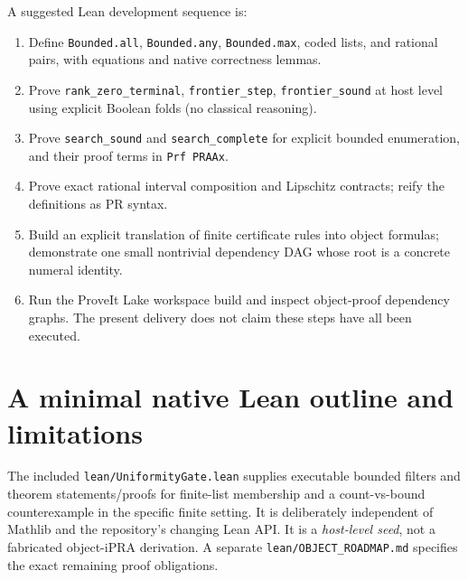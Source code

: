 \documentclass[11pt]{article}
\begin{document}
A suggested Lean development sequence is:
\begin{enumerate}[label=(\arabic*)]
\item Define \texttt{Bounded.all}, \texttt{Bounded.any}, \texttt{Bounded.max}, coded lists, and rational pairs, with equations and native correctness lemmas.
\item Prove \texttt{rank\_zero\_terminal}, \texttt{frontier\_step}, \texttt{frontier\_sound} at host level using explicit Boolean folds (no classical reasoning).
\item Prove \texttt{search\_sound} and \texttt{search\_complete} for explicit bounded enumeration, and their proof terms in \texttt{Prf PRAAx}.
\item Prove exact rational interval composition and Lipschitz contracts; reify the definitions as PR syntax.
\item Build an explicit translation of finite certificate rules into object formulas; demonstrate one small nontrivial dependency DAG whose root is a concrete numeral identity.
\item Run the ProveIt Lake workspace build and inspect object-proof dependency graphs. The present delivery does not claim these steps have all been executed.
\end{enumerate}

\section{A minimal native Lean outline and limitations}
The included \texttt{lean/UniformityGate.lean} supplies executable bounded filters and theorem statements/proofs for finite-list membership and a count-vs-bound counterexample in the specific finite setting. It is deliberately independent of Mathlib and the repository's changing Lean API. It is a \emph{host-level seed}, not a fabricated object-iPRA derivation. A separate \texttt{lean/OBJECT\_ROADMAP.md} specifies the exact remaining proof obligations.
\end{document}
